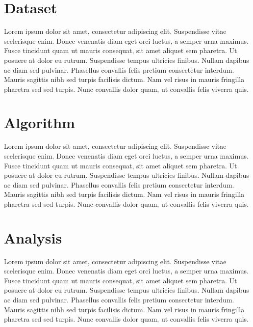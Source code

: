 \documentclass{sig-alternate}
\begin{document}

\section{Dataset}
Lorem ipsum dolor sit amet, consectetur adipiscing elit. Suspendisse vitae scelerisque enim. Donec venenatis diam eget orci luctus, a semper urna maximus. Fusce tincidunt quam ut mauris consequat, sit amet aliquet sem pharetra. Ut posuere at dolor eu rutrum. Suspendisse tempus ultricies finibus. Nullam dapibus ac diam sed pulvinar. Phasellus convallis felis pretium consectetur interdum. Mauris sagittis nibh sed turpis facilisis dictum. Nam vel risus in mauris fringilla pharetra sed sed turpis. Nunc convallis dolor quam, ut convallis felis viverra quis.


\section{Algorithm}
Lorem ipsum dolor sit amet, consectetur adipiscing elit. Suspendisse vitae scelerisque enim. Donec venenatis diam eget orci luctus, a semper urna maximus. Fusce tincidunt quam ut mauris consequat, sit amet aliquet sem pharetra. Ut posuere at dolor eu rutrum. Suspendisse tempus ultricies finibus. Nullam dapibus ac diam sed pulvinar. Phasellus convallis felis pretium consectetur interdum. Mauris sagittis nibh sed turpis facilisis dictum. Nam vel risus in mauris fringilla pharetra sed sed turpis. Nunc convallis dolor quam, ut convallis felis viverra quis.


\section{Analysis}
Lorem ipsum dolor sit amet, consectetur adipiscing elit. Suspendisse vitae scelerisque enim. Donec venenatis diam eget orci luctus, a semper urna maximus. Fusce tincidunt quam ut mauris consequat, sit amet aliquet sem pharetra. Ut posuere at dolor eu rutrum. Suspendisse tempus ultricies finibus. Nullam dapibus ac diam sed pulvinar. Phasellus convallis felis pretium consectetur interdum. Mauris sagittis nibh sed turpis facilisis dictum. Nam vel risus in mauris fringilla pharetra sed sed turpis. Nunc convallis dolor quam, ut convallis felis viverra quis.
\end{document}
